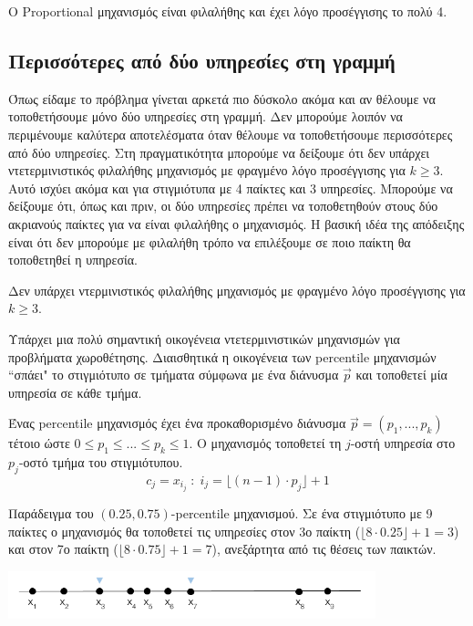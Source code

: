 \begin{theoremgr} 
 O Proportional μηχανισμός είναι φιλαλήθης και έχει λόγο προσέγγισης το πολύ 4.
\end{theoremgr}

\subsection*{Περισσότερες από δύο υπηρεσίες στη γραμμή}

Όπως είδαμε το πρόβλημα γίνεται αρκετά πιο δύσκολο ακόμα και αν θέλουμε να τοποθετήσουμε μόνο δύο υπηρεσίες στη γραμμή. Δεν μπορούμε λοιπόν να περιμένουμε καλύτερα αποτελέσματα όταν θέλουμε να τοποθετήσουμε περισσότερες από δύο υπηρεσίες. Στη πραγματικότητα μπορούμε να δείξουμε ότι δεν υπάρχει ντετερμινιστικός φιλαλήθης μηχανισμός με φραγμένο λόγο προσέγγισης για $k\ge3$. Αυτό ισχύει ακόμα και για στιγμιότυπα με 4 παίκτες και 3 υπηρεσίες. Μπορούμε να δείξουμε ότι, όπως και πριν, οι δύο υπηρεσίες πρέπει να τοποθετηθούν στους δύο ακριανούς παίκτες για να είναι φιλαλήθης ο μηχανισμός. Η βασική ιδέα της απόδειξης είναι ότι δεν μπορούμε με φιλαλήθη τρόπο να επιλέξουμε σε ποιο παίκτη θα τοποθετηθεί η υπηρεσία. 

\begin{theoremgr}
Δεν υπάρχει ντερμινιστικός φιλαλήθης μηχανισμός με φραγμένο λόγο προσέγγισης για $k\ge3$.
\end{theoremgr}

Υπάρχει μια πολύ σημαντική οικογένεια ντετερμινιστικών μηχανισμών για προβλήματα χωροθέτησης. Διαισθητικά η οικογένεια των percentile μηχανισμών ``σπάει" το στιγμιότυπο σε τμήματα σύμφωνα με ένα διάνυσμα $\vec{p}$ και τοποθετεί μία υπηρεσία σε κάθε τμήμα. 

\begin{definitiongr}
    Ένας percentile μηχανισμός έχει ένα προκαθορισμένο διάνυσμα $\vec{p}=(p_1,...,p_k)$ τέτοιο ώστε $0\le p_1\le...\le p_k \le 1$. Ο μηχανισμός τοποθετεί τη $j$-οστή υπηρεσία στο $p_j$-οστό τμήμα του στιγμιότυπου. 
\[ c_j = x_{i_j}\; :\; i_j = \lfloor (n-1)\cdot p_j \rfloor +1 \]
\end{definitiongr}

Παράδειγμα του $(0.25,0.75)$-percentile μηχανισμού. Σε ένα στιγμιότυπο με 9 παίκτες ο μηχανισμός θα τοποθετεί τις υπηρεσίες στον 3ο παίκτη ($\lfloor 8\cdot 0.25 \rfloor +1  = 3$) και στον 7ο παίκτη ($\lfloor 8\cdot 0.75 \rfloor +1 = 7$), ανεξάρτητα από τις θέσεις των παικτών.
    \begin{center}
        \includegraphics[width=0.8\textwidth]{Images/percentile.png}
    \end{center}


